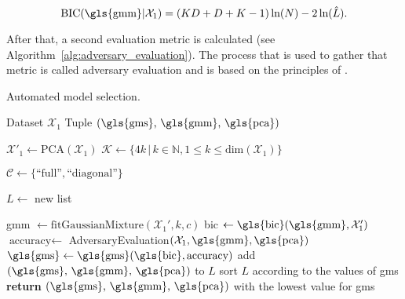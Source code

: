 \documentclass[../../main.tex]{subfiles}
\begin{document}
 \begin{equation}
     \text{BIC}(\text{\gls{gmm}}|\mathcal{X}_1) = (KD+D+K-1) \, \text{ln}(N) - 2 \, \text{ln}(\hat{L}).
 \end{equation}

 After that, a second evaluation metric is calculated (see Algorithm~\ref{alg:adversary_evaluation}). The process that is used to gather that metric is called adversary evaluation and is based on the principles of .

\begin{algorithm}
    \caption[Automated model selection]{Automated model selection.}
    \label{alg:model_selection}
    \begin{algorithmic}[1]
        \REQUIRE Dataset $\mathcal{X}_1$
        \ENSURE Tuple $(\text{\gls{gms}, \gls{gmm}, \gls{pca}})$

        \STATE $\mathcal{X}'_1 \leftarrow \text{PCA}(\mathcal{X}_1)$
        \STATE $\mathcal{K} \leftarrow \{ 4k \, | \,  k\in \mathbb{N}, 1 \leq k \leq \text{dim}(\mathcal{X}_1) \}$
        
        \STATE $\mathcal{C} \leftarrow \{\text{``full''}, \text{``diagonal''}\}$

        \STATE $L \leftarrow$ new list

                \STATE \gls{gmm} $\leftarrow \text{fitGaussianMixture}(\mathcal{X}_1', k, c)$
                \STATE \gls{bic} $\leftarrow \text{\gls{bic}}(\text{\gls{gmm}}, \mathcal{X}_1')$
                \STATE $\text{accuracy} \leftarrow$ AdversaryEvaluation$(\mathcal{X}_1, \text{\gls{gmm}}, \text{\gls{pca}})$
                \STATE $\text{\gls{gms}} \leftarrow \text{\gls{gms}}(\text{\gls{bic}}, \text{accuracy})$
                \STATE add $(\text{\gls{gms}, \gls{gmm}, \gls{pca}})$ to $L$
            \ENDFOR
        \ENDFOR
        \STATE sort $L$ according to the values of \gls{gms} 
        \STATE \textbf{return} $(\text{\gls{gms}, \gls{gmm}, \gls{pca}})$ with the lowest value for \gls{gms}
    \end{algorithmic}
 \end{algorithm}
\end{document}
